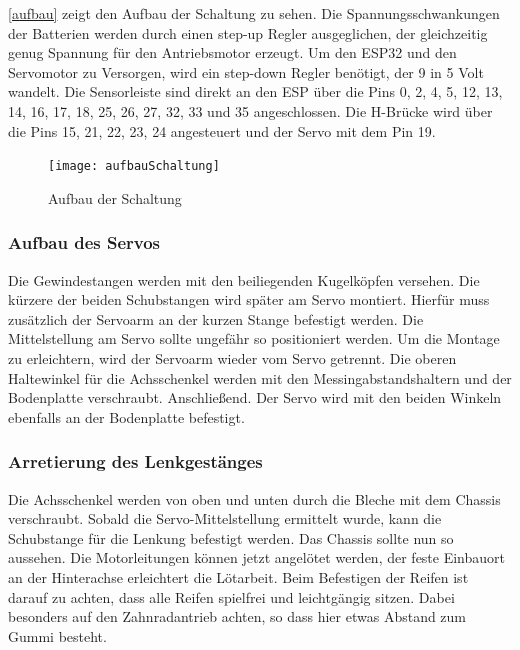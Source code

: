         
	    
	    \autoref{aufbau} zeigt den Aufbau der Schaltung zu sehen. Die Spannungsschwankungen der Batterien werden durch einen step-up Regler ausgeglichen, der gleichzeitig genug Spannung für den Antriebsmotor erzeugt. Um den ESP32 und den Servomotor zu Versorgen, wird ein step-down Regler benötigt, der 9 in 5 Volt wandelt. Die Sensorleiste sind direkt an den ESP über die Pins 0, 2, 4, 5, 12, 13, 14, 16, 17, 18, 25, 26, 27, 32, 33 und 35 angeschlossen. Die H-Brücke wird über die Pins 15, 21, 22, 23, 24 angesteuert und der Servo mit dem Pin 19.
	    
	    \begin{figure}[H]
	    	\centering
	    	\label{aufbau}
	    	\texttt{[image: aufbauSchaltung]}
	    	\caption{Aufbau der Schaltung}
	    \end{figure}
	    
        \subsubsection{Aufbau des Servos}
        
            Die Gewindestangen werden mit den beiliegenden Kugelköpfen versehen. Die kürzere der beiden Schubstangen wird später am Servo montiert. Hierfür muss zusätzlich der Servoarm an der kurzen Stange befestigt werden. Die Mittelstellung am Servo sollte ungefähr so positioniert werden. Um die Montage zu erleichtern, wird der Servoarm wieder vom Servo getrennt.
            Die oberen Haltewinkel für die Achsschenkel werden mit den Messingabstandshaltern und der Bodenplatte verschraubt. Anschließend. Der Servo wird mit den beiden Winkeln ebenfalls an der Bodenplatte befestigt.\cite{roboter-bausatz.de2WDRCSMART2020}
			
        \subsubsection{Arretierung des Lenkgestänges}
            Die Achsschenkel werden von oben und unten durch die Bleche mit dem Chassis verschraubt. Sobald die Servo-Mittelstellung ermittelt wurde, kann die Schubstange für die Lenkung befestigt werden. Das Chassis sollte nun so aussehen. Die Motorleitungen können jetzt angelötet werden, der feste Einbauort an der Hinterachse erleichtert die Lötarbeit. Beim Befestigen der Reifen ist darauf zu achten, dass alle Reifen spielfrei und leichtgängig sitzen. Dabei besonders auf den Zahnradantrieb achten, so dass hier etwas Abstand zum Gummi besteht.\cite{roboter-bausatz.de2WDRCSMART2020}\\
            

